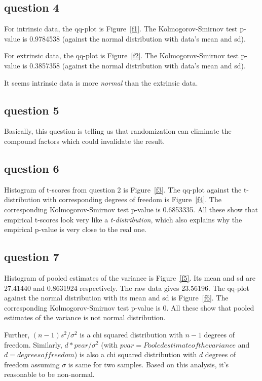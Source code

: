 \documentclass[a4paper,10pt]{article}
\begin{document}
\subsection{question 4}

For intrinsic data, the qq-plot is Figure~\ref{f1}. The Kolmogorov-Smirnov test p-value is 0.9784538 (against the normal distribution with data's mean and sd).

For extrinsic data, the qq-plot is Figure~\ref{f2}. The Kolmogorov-Smirnov test p-value is 0.3857358 (against the normal distribution with data's mean and sd).

It seems intrinsic data is more \emph{normal} than the extrinsic data.

\subsection{question 5}
Basically, this question is telling us that randomization can eliminate the compound factors which could invalidate the result.

\subsection{question 6}
Histogram of t-scores from question 2 is Figure~\ref{f3}. The qq-plot against the t-distribution with corresponding degrees of freedom is Figure~\ref{f4}. The corresponding Kolmogorov-Smirnov test p-value is 0.6853335. All these show that empirical t-scores look very like a \emph{t-distribution}, which also explains why the empirical p-value is very close to the real one.

\subsection{question 7}
Histogram of pooled estimates of the variance is Figure~\ref{f5}. Its mean and sd are 27.41440 and 0.8631924 respectively. The raw data gives 23.56196. The qq-plot against the normal distribution with its mean and sd is Figure~\ref{f6}. The corresponding Kolmogorov-Smirnov test p-value is 0. All these show that pooled estimates of the variance is not normal distribution.

Further, $(n-1)s^2/\sigma^2$ is a chi squared distribution with $n-1$ degrees of freedom. Similarly, $d*pvar/\sigma^2$ (with $pvar=Pooled estimate of the variance$ and $d=degrees of freedom$) is also a chi squared distribution with $d$ degrees of freedom assuming $\sigma$ is same for two samples. Based on this analysis, it's reasonable to be non-normal.
\end{document}
